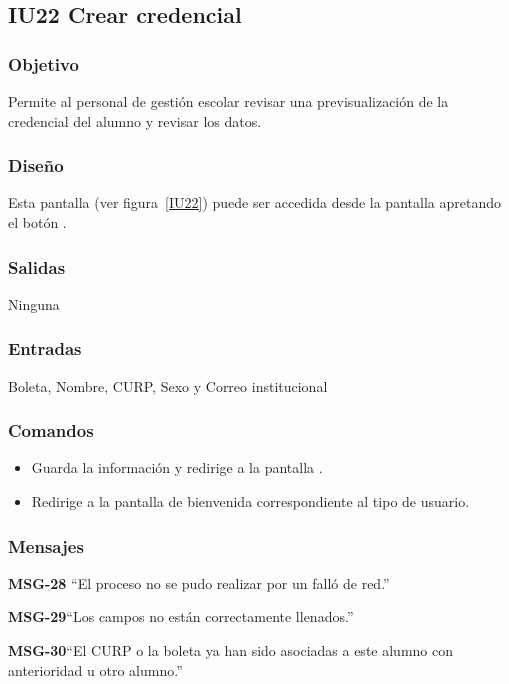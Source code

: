 
\subsection{IU22 Crear credencial}

\subsubsection{Objetivo}
   Permite al personal de gestión escolar revisar una previsualización de la credencial del alumno y revisar los datos.
\subsubsection{Diseño}
    Esta pantalla  (ver figura~\ref{IU22}) puede ser accedida desde la pantalla  apretando el botón .


\subsubsection{Salidas}
Ninguna
\subsubsection{Entradas}
    Boleta, Nombre, CURP, Sexo y Correo institucional
\subsubsection{Comandos}
\begin{itemize}
\item {} Guarda la información y redirige a la pantalla .
    \item {} Redirige a la pantalla de bienvenida correspondiente al tipo de usuario.
    
\end{itemize}

\subsubsection{Mensajes}

\begin{Citemize}
    \item {\bf MSG-28}  ``El proceso no se pudo realizar por un falló de red.''
    \item {\bf MSG-29}{``Los campos no están correctamente llenados.''}
    \item {\bf MSG-30}{``El CURP o la boleta ya han sido asociadas a este alumno con anterioridad u otro alumno.''}
\end{Citemize}
